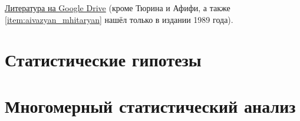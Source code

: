 \documentclass[a4paper,12pt]{report}
\begin{document}
    \href{https://drive.google.com/drive/folders/18WM37ML5G8PERAv0esU2HV9sqEgyejj0?usp=sharing}{Литература на Google Drive} (кроме Тюрина и Афифи, а также \ref{item:aivazyan_mhitaryan} нашёл только в издании 1989 года).

    \chapter{Статистические гипотезы}
    
    
    
    \chapter{Многомерный статистический анализ}
    
    
\end{document}
